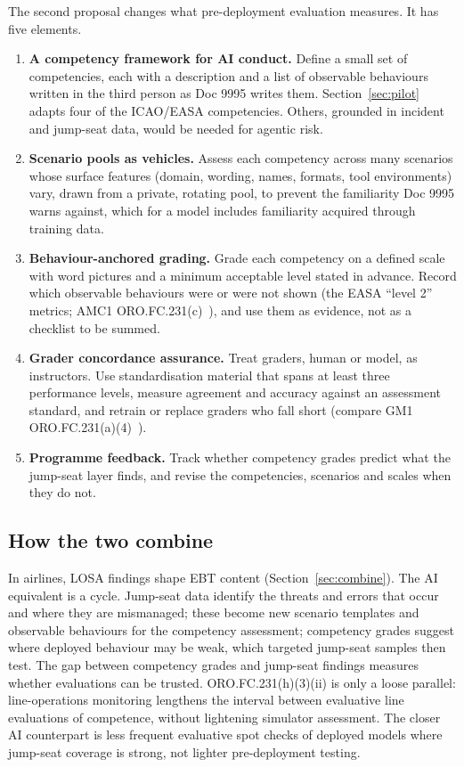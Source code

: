 \documentclass[11pt]{article}
\begin{document}
The second proposal changes what pre-deployment evaluation measures. It has five elements.

\begin{enumerate}
  \item \textbf{A competency framework for AI conduct.} Define a small set of competencies, each with a description and a list of observable behaviours written in the third person as Doc 9995 writes them. Section~\ref{sec:pilot} adapts four of the ICAO/EASA competencies. Others, grounded in incident and jump-seat data, would be needed for agentic risk.
  \item \textbf{Scenario pools as vehicles.} Assess each competency across many scenarios whose surface features (domain, wording, names, formats, tool environments) vary, drawn from a private, rotating pool, to prevent the familiarity Doc 9995 warns against, which for a model includes familiarity acquired through training data.
  \item \textbf{Behaviour-anchored grading.} Grade each competency on a defined scale with word pictures and a minimum acceptable level stated in advance. Record which observable behaviours were or were not shown (the EASA ``level 2'' metrics; AMC1 ORO.FC.231(c)~\cite{easa2026ear}), and use them as evidence, not as a checklist to be summed.
  \item \textbf{Grader concordance assurance.} Treat graders, human or model, as instructors. Use standardisation material that spans at least three performance levels, measure agreement and accuracy against an assessment standard, and retrain or replace graders who fall short (compare GM1 ORO.FC.231(a)(4)~\cite{easa2026ear}).
  \item \textbf{Programme feedback.} Track whether competency grades predict what the jump-seat layer finds, and revise the competencies, scenarios and scales when they do not.
\end{enumerate}

\subsection{How the two combine}\label{sec:combined}

In airlines, LOSA findings shape EBT content (Section~\ref{sec:combine}). The AI equivalent is a cycle. Jump-seat data identify the threats and errors that occur and where they are mismanaged; these become new scenario templates and observable behaviours for the competency assessment; competency grades suggest where deployed behaviour may be weak, which targeted jump-seat samples then test. The gap between competency grades and jump-seat findings measures whether evaluations can be trusted. ORO.FC.231(h)(3)(ii) is only a loose parallel: line-operations monitoring lengthens the interval between evaluative line evaluations of competence, without lightening simulator assessment. The closer AI counterpart is less frequent evaluative spot checks of deployed models where jump-seat coverage is strong, not lighter pre-deployment testing.
\end{document}
